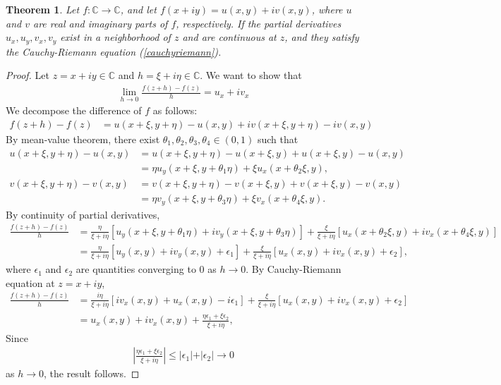 \documentclass{article}
\numberwithin{equation}{section}
\newcommand{\bbC}{\mathbb{C}}
\theoremstyle{plain}
\newtheorem{theorem}{Theorem}[section]
\theoremstyle{definition}
\begin{document}
\begin{theorem}
Let $f:\bbC\to\bbC$, and let $f(x+iy)=u(x,y)+iv(x,y)$, where $u$ and $v$ are real and imaginary parts of $f$, respectively. If the partial derivatives $u_x,u_y,v_x,v_y$ exist in a neighborhood of $z$ and are continuous at $z$, and they satisfy the Cauchy-Riemann equation (\ref{cauchyriemann}).
\end{theorem}
\begin{proof}
Let $z=x+iy\in\bbC$ and $h=\xi+i\eta\in\bbC$. We want to show that
\begin{align*}
	\lim_{h\to 0}\frac{f(z+h)-f(z)}{h}=u_x+iv_x
\end{align*}
We decompose the difference of $f$ as follows:
\begin{align*}
	f(z+h)-f(z)&=u(x+\xi,y+\eta)-u(x,y)+iv(x+\xi,y+\eta)-iv(x,y)
\end{align*}
By mean-value theorem, there exist $\theta_1,\theta_2,\theta_3,\theta_4\in(0,1)$ such that
\begin{align*}
	u(x+\xi,y+\eta)-u(x,y)&=u(x+\xi,y+\eta)-u(x+\xi,y)+u(x+\xi,y)-u(x,y)\\
	&=\eta u_y(x+\xi,y+\theta_1\eta)+\xi u_x(x+\theta_2\xi,y),\\
	v(x+\xi,y+\eta)-v(x,y)&=v(x+\xi,y+\eta)-v(x+\xi,y)+v(x+\xi,y)-v(x,y)\\
	&=\eta v_y(x+\xi,y+\theta_3\eta)+\xi v_x(x+\theta_4\xi,y).
\end{align*}
By continuity of partial derivatives,
\begin{align*}
	\frac{f(z+h)-f(z)}{h}&=\frac{\eta}{\xi+i\eta}\left[u_y(x+\xi,y+\theta_1\eta)+iv_y(x+\xi,y+\theta_3\eta)\right]+\frac{\xi}{\xi+i\eta}\left[u_x(x+\theta_2\xi,y)+iv_x(x+\theta_4\xi,y)\right]\\
	&=\frac{\eta}{\xi+i\eta}\left[u_y(x,y)+iv_y(x,y)+\epsilon_1\right]+\frac{\xi}{\xi+i\eta}\left[u_x(x,y)+iv_x(x,y)+\epsilon_2\right],
\end{align*}
where $\epsilon_1$ and $\epsilon_2$ are quantities converging to $0$ as $h\to 0$. By Cauchy-Riemann equation at $z=x+iy$,
\begin{align*}
	\frac{f(z+h)-f(z)}{h}&=\frac{i\eta}{\xi+i\eta}\left[iv_x(x,y)+ u_x(x,y)-i\epsilon_1\right]+\frac{\xi}{\xi+i\eta}\left[u_x(x,y)+iv_x(x,y)+\epsilon_2\right]\\
	&=u_x(x,y)+iv_x(x,y)+\frac{\eta\epsilon_1+\xi\epsilon_2}{\xi+i\eta},
\end{align*}
Since
\begin{align*}
	\left\vert\frac{\eta\epsilon_1+\xi\epsilon_2}{\xi+i\eta}\right\vert\leq\vert\epsilon_1\vert+\vert\epsilon_2\vert\to 0
\end{align*}
as $h\to0$, the result follows.
\end{proof}
\end{document}
